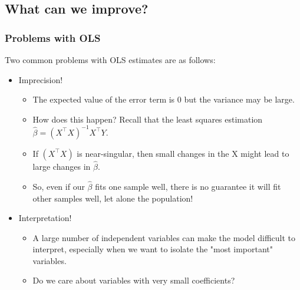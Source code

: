 \documentclass{beamer}
\begin{document}
\subsection{What can we improve?}
\frame
{
  \frametitle{Problems with OLS}
  
  Two common problems with OLS estimates are as follows:
  \begin{itemize}
  \item<1-> Imprecision! 
  \begin{itemize}
        \item<2-> The expected value of the error term is 0 but the variance may be large.
        \item<3-> How does this happen? Recall that the least squares estimation $\hat{\beta} = (X^\intercal X)^{-1}X^\intercal Y$.
        \item<4->If $(X^\intercal X)$ is near-singular, then small changes in the X might lead to large changes in $\hat{\beta}$.
        \item<5->So, even if our $\hat{\beta}$ fits one sample well, there is no guarantee it will fit other samples well, let alone the population!  
  \end{itemize}
  \item<6-> Interpretation!
  \begin{itemize}
      \item<7-> A large number of independent variables can make the model difficult to interpret, especially when we want to isolate the "most important" variables.
      \item<8-> Do we care about variables with very small coefficients?
  \end{itemize}
  \end{itemize}
}
\end{document}
